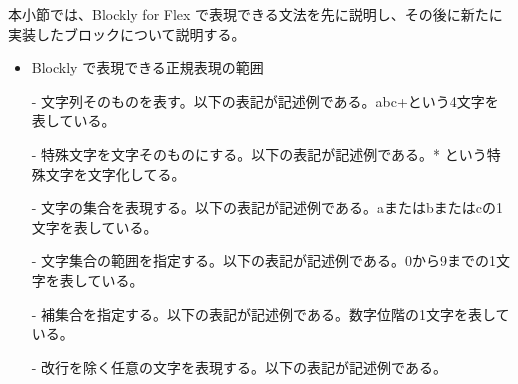 \documentclass{risepaper}
\begin{document}
本小節では、Blockly for Flex で表現できる文法を先に説明し、その後に新たに実装したブロックについて説明する。

\begin{itemize}

\item Blockly で表現できる正規表現の範囲

- 文字列そのものを表す。以下の表記が記述例である。abc+という4文字を表している。


- 特殊文字を文字そのものにする。以下の表記が記述例である。* という特殊文字を文字化してる。

\shadowbox{
\begin{minipage}[t]{3cm}
\begin{verbatim}
\*
\end{verbatim}
\end{minipage}
}

- 文字の集合を表現する。以下の表記が記述例である。aまたはbまたはcの1文字を表している。

\shadowbox{
\begin{minipage}[t]{3cm}
\begin{verbatim}
[abc]
\end{verbatim}
\end{minipage}
}

- 文字集合の範囲を指定する。以下の表記が記述例である。0から9までの1文字を表している。

\shadowbox{
\begin{minipage}[t]{3cm}
\begin{verbatim}
[0-9]
\end{verbatim}
\end{minipage}
}

- 補集合を指定する。以下の表記が記述例である。数字位階の1文字を表している。

\shadowbox{
\begin{minipage}[t]{3cm}
\begin{verbatim}
[^0-9]
\end{verbatim}
\end{minipage}
}

- 改行を除く任意の文字を表現する。以下の表記が記述例である。



\end{itemize}
\end{document}
